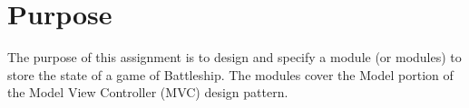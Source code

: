 \documentclass[12pt]{article}
\begin{document}



\newcommand{\name}{Dawson Myers}
\newcommand{\macid}{myersd1}
\newcommand{\sn}{400005616}
\newcommand{\duedate}{April 5, 2017}
\newcommand{\school}{McMaster University}
\newcommand{\course}{SFWR ENG 2AA4}
\newcommand{\assignmentTitle}{Assignment 4}






\renewcommand\thesection{\arabic{section}} 
\renewcommand\thesubsection{\thesection.\arabic{subsection}}


\tableofcontents

\lstlistoflistings

\newpage


\section{Purpose}
The purpose of this assignment is to design and specify a module (or modules) to store the state of a game of Battleship. The modules cover the Model portion of the Model View Controller (MVC) design pattern.

\newpage

\end{document}
